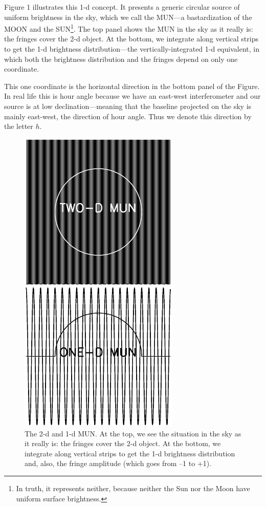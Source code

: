 \documentclass[11pt,preprint]{aastex}
\begin{document}
	Figure 1 illustrates this 1-d concept. It presents a generic
circular  source of uniform brightness in the sky, which we call the
MUN---a bastardization of the MOON and the SUN\footnote{In truth, it
represents neither, because neither the Sun nor the Moon have uniform
surface brightness.}. The top panel shows the MUN in the sky as it
really is: the fringes cover the 2-d object. At the bottom, we integrate
along vertical strips to get the 1-d brightness distribution---the
vertically-integrated 1-d equivalent, in which both the brightness
distribution and the fringes depend on only one coordinate. 

	This one coordinate is the horizontal direction in the bottom
panel of the Figure. In real life this is hour angle because we have an
east-west interferometer and our source is at low declination---meaning
that the baseline projected on the sky is mainly east-west, the
direction of hour angle. Thus we denote this direction by the letter
$h$. 

\begin{figure}[h!]
\begin{center}
\includegraphics[width=3.0in] {interf_fig.ps}
\end{center}
                                                                                
\caption{The 2-d and 1-d MUN. At the top, we see the situation in the
sky as it really is: the fringes cover the 2-d object.
At the bottom, we integrate along vertical strips to get the 1-d
brightness distribution and, also, the fringe amplitude (which goes from
--1 to +1). 
\label{interf_fig} } \end{figure}
\end{document}
